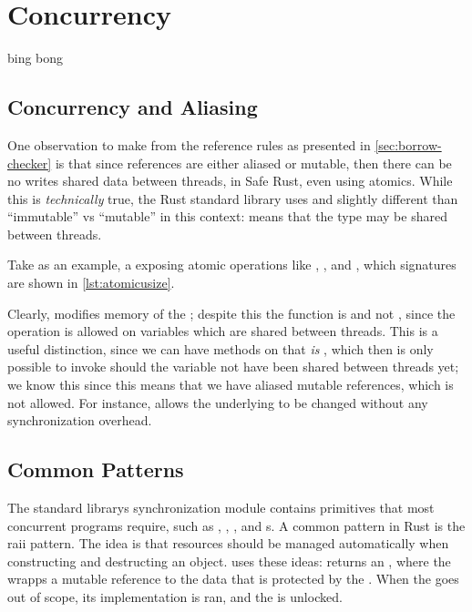 \section{Concurrency}

bing bong

\subsection{Concurrency and Aliasing\label{sec:concurrency-and-aliasing}}

One observation to make from the reference rules as presented in \cref{sec:borrow-checker} is that
since references are either aliased or mutable, then there can be no writes shared data between
threads, in Safe Rust, even using atomics. While this is \emph{technically} true, the Rust standard
library uses  and  slightly different than ``immutable'' vs ``mutable'' in
this context:  means that the type may be shared between threads.

Take  as an example, a  exposing atomic operations like ,
, and , which signatures are shown in \cref{lst:atomicusize}.

Clearly,  modifies memory of the ; despite this the function
is  and not , since the operation is allowed on variables which are
shared between threads.
This is a useful distinction, since we can have methods on  that \emph{is}
, which then is only possible to invoke should the variable not have been shared
between threads yet; we know this since this means that we have aliased mutable references, which
is not allowed. For instance,  allows the
underlying  to be changed without any synchronization overhead.


\subsection{Common Patterns}

The standard librarys synchronization module  contains primitives that most
concurrent programs require, such as , , , and
s. A common pattern in Rust is the \gls{raii} pattern. The idea is that resources
should be managed automatically when constructing and destructing an object.  uses
these ideas:  returns an , where the 
wrapps a mutable reference to the data that is protected by the . When the
 goes out of scope, its  implementation is ran, and the  is
unlocked.

